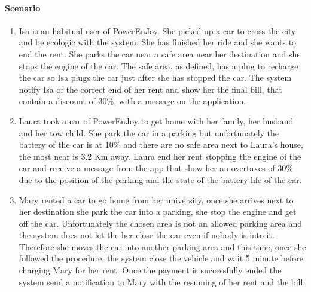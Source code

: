 \paragraph{Scenario}
\begin{enumerate}
	\item Isa is an habitual user of PowerEnJoy. She picked-up a car to cross the city and be ecologic with the system. She has finished her ride and she wants to end the rent. She parks the car near a safe area near her destination and she stops the engine of the car. The safe area, as defined, has a plug to recharge the car so Isa plugs the car just after she has stopped the car. The system notify Isa of the correct end of her rent and show her the final bill, that contain a discount of 30\%, with a message on the application.
	\item Laura took a car of PowerEnJoy to get home with her family, her husband and her tow child. She park the car in a parking but unfortunately the battery of the car is at 10\% and there are no safe area next to Laura's house, the most near is 3.2 Km away. Laura end her rent stopping the engine of the car and receive a message from the app that show her an overtaxes of 30\% due to the position of the parking and the state of the battery life of the car.
	\item Mary rented a car to go home from her university, once she arrives next to her destination she park the car into a parking, she stop the engine and get off the car. Unfortunately the chosen area is not an allowed parking area and the system does not let the her close the car even if nobody is into it. Therefore she moves the car into another parking area and this time, once she followed the procedure, the system close the vehicle and wait 5 minute before charging Mary for her rent. Once the payment is successfully ended the system send a notification to Mary with the resuming of her rent and the bill.
\end{enumerate}
